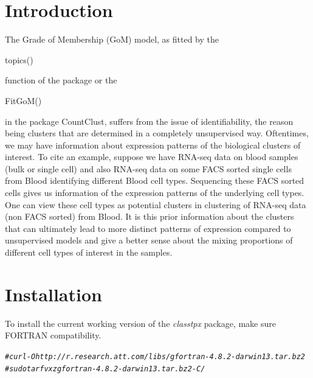 \documentclass[12pt]{article}\usepackage[]{graphicx}\usepackage[usenames,dvipsnames]{color}
\author{Kushal K Dey, Chiaowen Joyce Hsiao \& Matthew Stephens \\[1em] \small{\textit{Stephens Lab}, The University of Chicago} \mbox{ }\\ \small{\texttt{$^*$Correspondending Email: mstephens@uchicago.edu}}}
\makeatletter
\newcommand{\hlcom}[1]{\textcolor[rgb]{0.678,0.584,0.686}{\textit{#1}}}%
\newenvironment{kframe}{%
 \def\at@end@of@kframe{}%
 \ifinner\ifhmode%
  \def\at@end@of@kframe{\end{minipage}}%
  \begin{minipage}{\columnwidth}%
 \fi\fi%
 \def\FrameCommand##1{\hskip\@totalleftmargin \hskip-\fboxsep
 \colorbox{shadecolor}{##1}\hskip-\fboxsep
     \hskip-\linewidth \hskip-\@totalleftmargin \hskip\columnwidth}%
 \MakeFramed {\advance\hsize-\width
   \@totalleftmargin\z@ \linewidth\hsize
   \@setminipage}}%
 {\par\unskip\endMakeFramed%
 \at@end@of@kframe}
\newenvironment{knitrout}{}{} %
\newcommand{\classtpx}{\textit{classtpx}}
\makeatother
\begin{document}
\maketitle



\newpage

\tableofcontents

\section{Introduction}

The Grade of Membership (GoM) model, as fitted by the \begin{verb} topics() \end{verb} function of the package  or the \begin{verb} FitGoM() \end{verb} in the package CountClust, suffers from the issue of identifiability, the reason being clusters that are determined in a completely unsupervised way. Oftentimes, we may have information about expression patterns of the biological clusters of interest. To cite an example, suppose we have RNA-seq data on blood samples (bulk or single cell) and also RNA-seq data on some FACS sorted single cells from Blood identifying different Blood cell types. Sequencing these FACS sorted cells gives us information of the expression patterns of the underlying cell types. One can view these cell types as potential clusters in clustering of RNA-seq data (non FACS sorted) from Blood. It is this prior information about the clusters that can ultimately lead to more distinct patterns of expression compared to unsupervised models and give a better sense about the mixing proportions of different cell types of interest in the samples.

\section{Installation}

To install the current working version of the \classtpx{} package, make sure FORTRAN compatibility.

\begin{knitrout}
\color{fgcolor}\begin{kframe}
\begin{alltt}
\hlcom{#curl -O http://r.research.att.com/libs/gfortran-4.8.2-darwin13.tar.bz2}
\hlcom{#sudo tar fvxz gfortran-4.8.2-darwin13.tar.bz2 -C /}
\end{alltt}
\end{kframe}
\end{knitrout}
\end{document}
